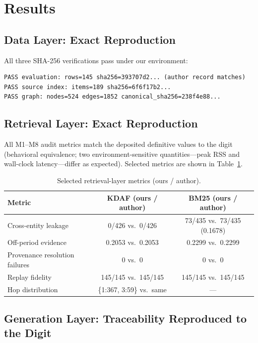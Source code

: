 \documentclass[11pt]{article}
\begin{document}
\section{Results}

\subsection{Data Layer: Exact Reproduction}

All three SHA-256 verifications pass under our environment:
\begin{verbatim}
PASS evaluation: rows=145 sha256=393707d2... (author record matches)
PASS source index: items=189 sha256=6f6f17b2...
PASS graph: nodes=524 edges=1852 canonical_sha256=238f4e88...
\end{verbatim}

\subsection{Retrieval Layer: Exact Reproduction}

All M1--M8 audit metrics match the deposited definitive values to the digit (behavioral equivalence; two environment-sensitive quantities---peak RSS and wall-clock latency---differ as expected). Selected metrics are shown in Table~\ref{tab:retrieval}.

\begin{table}[h]
\centering
\caption{Selected retrieval-layer metrics (ours / author).}
\label{tab:retrieval}
\begin{tabular}{lcc}
\toprule
\textbf{Metric} & \textbf{KDAF (ours / author)} & \textbf{BM25 (ours / author)} \\
\midrule
Cross-entity leakage & 0/426 vs.\ 0/426 & 73/435 vs.\ 73/435 (0.1678) \\
Off-period evidence & 0.2053 vs.\ 0.2053 & 0.2299 vs.\ 0.2299 \\
Provenance resolution failures & 0 vs.\ 0 & 0 vs.\ 0 \\
Replay fidelity & 145/145 vs.\ 145/145 & 145/145 vs.\ 145/145 \\
Hop distribution & \{1:367, 3:59\} vs.\ same & --- \\
\bottomrule
\end{tabular}
\end{table}

\subsection{Generation Layer: Traceability Reproduced to the Digit}
\end{document}
